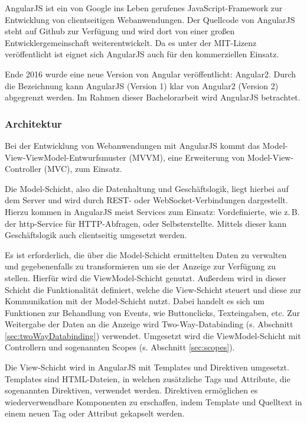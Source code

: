 AngularJS ist ein von Google ins Leben gerufenes JavaScript-Framework zur Entwicklung von clientseitigen Webanwendungen\cite{angular-faq}. Der Quellcode von AngularJS steht auf Github zur Verfügung und wird dort von einer großen Entwicklergemeinschaft weiterentwickelt\cite[][9]{ng-book}. Da es unter der MIT-Lizenz veröffentlicht ist eignet sich AngularJS auch für den kommerziellen Einsatz\cites[9]{ng-book}[]{mit-license}.

Ende 2016 wurde eine neue Version von Angular veröffentlicht: Angular2\cite{ng2-out}. Durch die Bezeichnung kann AngularJS (Version 1) klar von Angular2 (Version 2) abgegrenzt werden. Im Rahmen dieser Bachelorarbeit wird AngularJS betrachtet.

\subsubsection{Architektur}
Bei der Entwicklung von Webanwendungen mit AngularJS kommt das Model-View-ViewModel-Entwurfsmuster (MVVM), eine Erweiterung von Model-View-Controller (MVC), zum Einsatz\cite[][21]{angular-boehm}. 

Die Model-Schicht, also die Datenhaltung und Geschäftslogik, liegt hierbei auf dem Server und wird durch REST- oder WebSocket-Verbindungen dargestellt. Hierzu kommen in AngularJS meist Services zum Einsatz: Vordefinierte, wie z.\,B. der http-Service für HTTP-Abfragen, oder Selbsterstellte\cite{angular-services}. Mittels dieser kann Geschäftslogik auch clientseitig umgesetzt werden.\cite[][21]{angular-boehm}

Es ist erforderlich, die über die Model-Schicht ermittelten Daten zu verwalten und gegebenenfalls zu transformieren um sie der Anzeige zur Verfügung zu stellen. Hierfür wird die ViewModel-Schicht genutzt. Außerdem wird in dieser Schicht die Funktionalität definiert, welche die View-Schicht steuert und diese zur Kommunikation mit der Model-Schicht nutzt. Dabei handelt es sich um Funktionen zur Behandlung von Events, wie Buttonclicks, Texteingaben, etc. Zur Weitergabe der Daten an die Anzeige wird Two-Way-Databinding (s. Abschnitt \ref{sec:twoWayDatabinding}) verwendet. Umgesetzt wird die ViewModel-Schicht mit Controllern und sogenannten Scopes (s. Abschnitt \ref{sec:scopes}). \cite[][21\psq]{angular-boehm}

Die View-Schicht wird in AngularJS mit Templates und Direktiven umgesetzt. Templates sind HTML-Dateien, in welchen zusätzliche Tags und Attribute, die sogenannten Direktiven, verwendet werden. \cite[][1\psqq]{angular-boehm}Direktiven ermöglichen es wiederverwendbare Komponenten zu erschaffen, indem Template und Quelltext in einem neuen Tag oder Attribut gekapselt werden\cite[][49\psq]{angular-boehm}.

